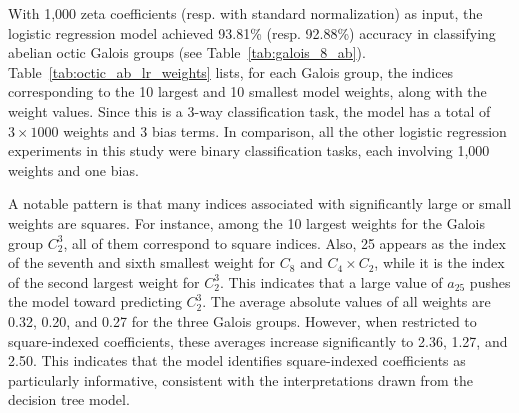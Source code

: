 \documentclass[letterpaper, 10pt]{article}
\newcommand{\1}{\mathds{1}}	%
\theoremstyle{definition}
\theoremstyle{remark}
\begin{document}
With 1,000 zeta coefficients (resp. with standard normalization) as input, the logistic regression model achieved 93.81\% (resp. 92.88\%) accuracy in classifying abelian octic Galois groups (see Table~\ref{tab:galois_8_ab}). Table~\ref{tab:octic_ab_lr_weights} lists, for each Galois group, the indices corresponding to the 10 largest and 10 smallest model weights, along with the weight values. Since this is a 3-way classification task, the model has a total of $3 \times 1000$ weights and 3 bias terms. In comparison, all the other logistic regression experiments in this study were binary classification tasks, each involving 1,000 weights and one bias.

A notable pattern is that many indices associated with significantly large or small weights are squares. For instance, among the 10 largest weights for the Galois group $C_2^3$, all of them correspond to square indices.
Also,  25 appears as the index of the  seventh and sixth smallest weight for $C_8$ and $C_4 \times C_2$, while it is the index of the second largest weight for $C_2^3$.
This indicates that a large value of $a_{25}$ pushes the model toward predicting $C_2^3$. The average absolute values of all weights are  0.32, 0.20, and 0.27 for the three Galois groups. However, when restricted to square-indexed coefficients, these averages increase significantly to  2.36, 1.27, and 2.50. This indicates that the model identifies square-indexed coefficients as particularly informative, consistent with the interpretations drawn from the decision tree model.
\end{document}
